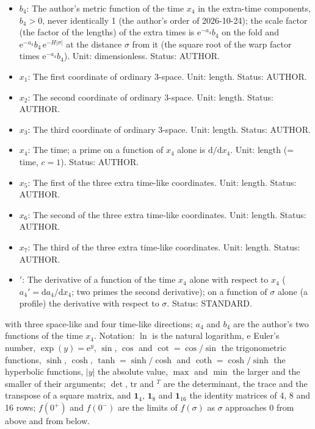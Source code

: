\documentclass[
  10pt,
]{article}
\begin{document}
\begin{itemize}
  Status: AUTHOR.
\item
  \(b_4\): The author's metric function of the time \(x_4\) in the
  extra-time components, \(b_4 > 0\), never identically 1 (the author's
  order of 2026-10-24); the scale factor (the factor of the lengths) of
  the extra times is \(\mathrm{e}^{-a_4}b_4\) on the fold and
  \(\mathrm{e}^{-a_4}b_4\,\mathrm{e}^{-H\lvert\sigma\rvert}\) at the
  distance \(\sigma\) from it (the square root of the warp factor times
  \(\mathrm{e}^{-a_4}b_4\)). Unit: dimensionless. Status: AUTHOR.
\item
  \(x_1\): The first coordinate of ordinary 3-space. Unit: length.
  Status: AUTHOR.
\item
  \(x_2\): The second coordinate of ordinary 3-space. Unit: length.
  Status: AUTHOR.
\item
  \(x_3\): The third coordinate of ordinary 3-space. Unit: length.
  Status: AUTHOR.
\item
  \(x_4\): The time; a prime on a function of \(x_4\) alone is
  \(\mathrm{d}/\mathrm{d}x_4\). Unit: length (= time, \(c = 1\)).
  Status: AUTHOR.
\item
  \(x_5\): The first of the three extra time-like coordinates. Unit:
  length. Status: AUTHOR.
\item
  \(x_6\): The second of the three extra time-like coordinates. Unit:
  length. Status: AUTHOR.
\item
  \(x_7\): The third of the three extra time-like coordinates. Unit:
  length. Status: AUTHOR.
\item
  \({}'\): The derivative of a function of the time \(x_4\) alone with
  respect to \(x_4\) (\(a_4' = \mathrm{d}a_4/\mathrm{d}x_4\); two primes
  the second derivative); on a function of \(\sigma\) alone (a profile)
  the derivative with respect to \(\sigma\). Status: STANDARD.
\end{itemize}

with three space-like and four time-like directions; \(a_4\) and \(b_4\)
are the author's two functions of the time \(x_4\). Notation: \(\ln\) is
the natural logarithm, \(\mathrm{e}\) Euler's number,
\(\exp(y) = \mathrm{e}^y\), \(\sin\), \(\cos\) and \(\cot = \cos/\sin\)
the trigonometric functions, \(\sinh\), \(\cosh\),
\(\tanh = \sinh/\cosh\) and \(\coth = \cosh/\sinh\) the hyperbolic
functions, \(\lvert y\rvert\) the absolute value, \(\max\) and \(\min\)
the larger and the smaller of their arguments; \(\det\), \(\mathrm{tr}\)
and \({}^T\) are the determinant, the trace and the transpose of a
square matrix, and \(\mathbf{1}_4\), \(\mathbf{1}_8\) and
\(\mathbf{1}_{16}\) the identity matrices of 4, 8 and 16 rows;
\(f(0^+)\) and \(f(0^-)\) are the limits of \(f(\sigma)\) as \(\sigma\)
approaches 0 from above and from below.
\end{document}
